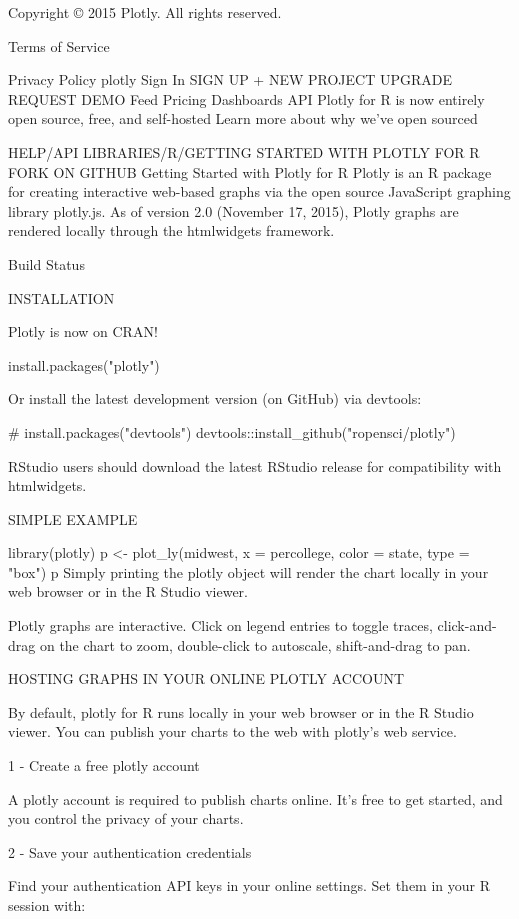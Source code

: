    
Copyright © 2015 Plotly. All rights reserved.

Terms of Service

Privacy Policy
 plotly Sign In SIGN UP  + NEW PROJECT  UPGRADE  REQUEST DEMO Feed Pricing Dashboards API
Plotly for R is now entirely open source, free, and self-hosted
Learn more about why we've open sourced

 HELP/API LIBRARIES/R/GETTING STARTED WITH PLOTLY FOR R FORK ON GITHUB
Getting Started with Plotly for R
Plotly is an R package for creating interactive web-based graphs via the open source JavaScript graphing library plotly.js. As of version 2.0 (November 17, 2015), Plotly graphs are rendered locally through the htmlwidgets framework.

 Build Status

INSTALLATION

Plotly is now on CRAN!

install.packages("plotly")

Or install the latest development version (on GitHub) via devtools:

# install.packages("devtools")
devtools::install_github("ropensci/plotly")

RStudio users should download the latest RStudio release for compatibility with htmlwidgets.

SIMPLE EXAMPLE

library(plotly)
p <- plot_ly(midwest, x = percollege, color = state, type = "box")
p
Simply printing the plotly object will render the chart locally in your web browser or in the R Studio viewer.


Plotly graphs are interactive. Click on legend entries to toggle traces, click-and-drag on the chart to zoom, double-click to autoscale, shift-and-drag to pan.

HOSTING GRAPHS IN YOUR ONLINE PLOTLY ACCOUNT

By default, plotly for R runs locally in your web browser or in the R Studio viewer. You can publish your charts to the web with plotly's web service.

1 - Create a free plotly account

A plotly account is required to publish charts online. It's free to get started, and you control the privacy of your charts.

2 - Save your authentication credentials

Find your authentication API keys in your online settings. Set them in your R session with:

